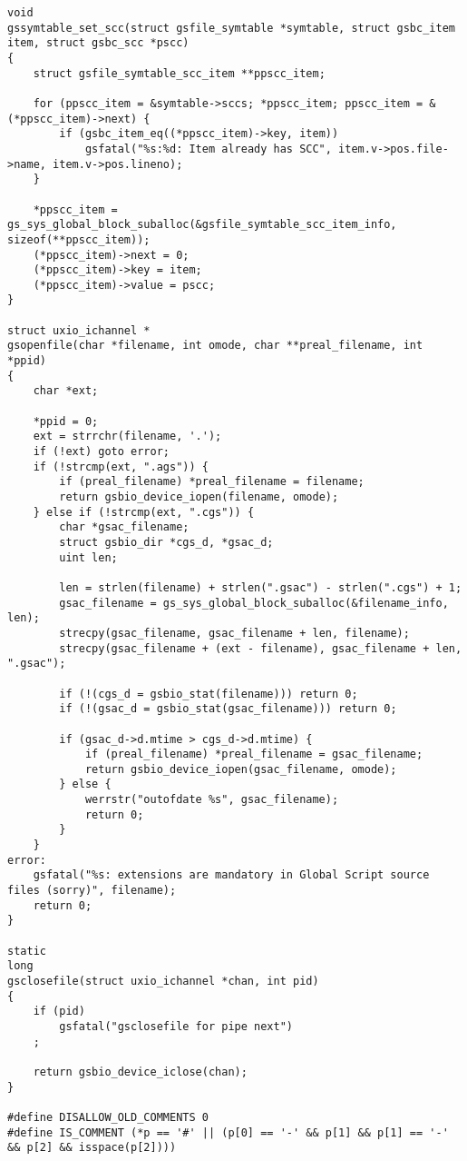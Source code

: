 \documentclass{report}
\begin{document}
\begin{verbatim}
void
gssymtable_set_scc(struct gsfile_symtable *symtable, struct gsbc_item item, struct gsbc_scc *pscc)
{
    struct gsfile_symtable_scc_item **ppscc_item;

    for (ppscc_item = &symtable->sccs; *ppscc_item; ppscc_item = &(*ppscc_item)->next) {
        if (gsbc_item_eq((*ppscc_item)->key, item))
            gsfatal("%s:%d: Item already has SCC", item.v->pos.file->name, item.v->pos.lineno);
    }

    *ppscc_item = gs_sys_global_block_suballoc(&gsfile_symtable_scc_item_info, sizeof(**ppscc_item));
    (*ppscc_item)->next = 0;
    (*ppscc_item)->key = item;
    (*ppscc_item)->value = pscc;
}

struct uxio_ichannel *
gsopenfile(char *filename, int omode, char **preal_filename, int *ppid)
{
    char *ext;

    *ppid = 0;
    ext = strrchr(filename, '.');
    if (!ext) goto error;
    if (!strcmp(ext, ".ags")) {
        if (preal_filename) *preal_filename = filename;
        return gsbio_device_iopen(filename, omode);
    } else if (!strcmp(ext, ".cgs")) {
        char *gsac_filename;
        struct gsbio_dir *cgs_d, *gsac_d;
        uint len;

        len = strlen(filename) + strlen(".gsac") - strlen(".cgs") + 1;
        gsac_filename = gs_sys_global_block_suballoc(&filename_info, len);
        strecpy(gsac_filename, gsac_filename + len, filename);
        strecpy(gsac_filename + (ext - filename), gsac_filename + len, ".gsac");

        if (!(cgs_d = gsbio_stat(filename))) return 0;
        if (!(gsac_d = gsbio_stat(gsac_filename))) return 0;

        if (gsac_d->d.mtime > cgs_d->d.mtime) {
            if (preal_filename) *preal_filename = gsac_filename;
            return gsbio_device_iopen(gsac_filename, omode);
        } else {
            werrstr("outofdate %s", gsac_filename);
            return 0;
        }
    }
error:
    gsfatal("%s: extensions are mandatory in Global Script source files (sorry)", filename);
    return 0;
}

static
long
gsclosefile(struct uxio_ichannel *chan, int pid)
{
    if (pid)
        gsfatal("gsclosefile for pipe next")
    ;

    return gsbio_device_iclose(chan);
}

#define DISALLOW_OLD_COMMENTS 0
#define IS_COMMENT (*p == '#' || (p[0] == '-' && p[1] && p[1] == '-' && p[2] && isspace(p[2])))


\end{verbatim}
\end{document}

